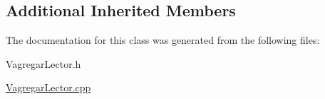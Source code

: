 \subsection*{Additional Inherited Members}


The documentation for this class was generated from the following files\+:\begin{DoxyCompactItemize}
\item 
Vagregar\+Lector.\+h\item 
\hyperlink{_vagregar_lector_8cpp}{Vagregar\+Lector.\+cpp}\end{DoxyCompactItemize}
